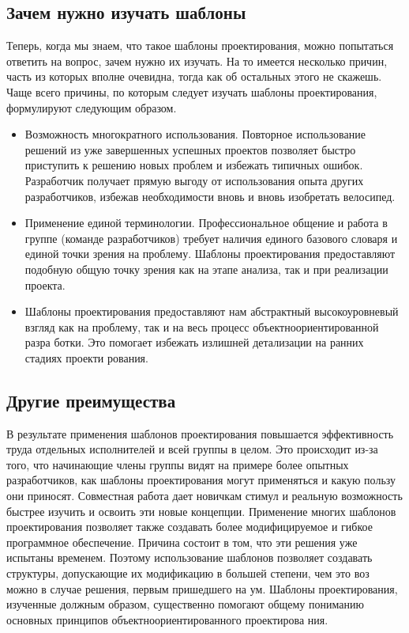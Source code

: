 \documentclass[10pt]{article}
\begin{document}
\subsection{Зачем нужно изучать шаблоны}
Теперь, когда мы знаем, что такое шаблоны проектирования, можно попытаться
ответить на вопрос, зачем нужно их изучать. На то имеется несколько причин, часть
из которых вполне очевидна, тогда как об остальных этого не скажешь.
Чаще всего причины, по которым следует изучать шаблоны проектирования,
формулируют следующим образом.
\begin{itemize}
	\item Возможность многократного использования. Повторное использование решений из
уже завершенных успешных проектов позволяет быстро приступить к решению
новых проблем и избежать типичных ошибок. Разработчик получает прямую
выгоду от использования опыта других разработчиков, избежав необходимости
вновь и вновь изобретать велосипед.
\item
Применение единой терминологии. Профессиональное общение и работа в группе
(команде разработчиков) требует наличия единого базового словаря и единой
точки зрения на проблему. Шаблоны проектирования предоставляют подобную
общую точку зрения как на этапе анализа, так и при реализации проекта.
\item 
Шаблоны проектирования предоставляют нам абстрактный высокоуровневый
взгляд как на проблему, так и на весь процесс объектноориентированной разра
ботки. Это помогает избежать излишней детализации на ранних стадиях проекти
рования.
\end{itemize}

\subsection{Другие преимущества}
В результате применения шаблонов проектирования повышается эффективность труда отдельных
исполнителей и всей группы в целом. Это происходит из-за того, что начинающие члены группы
видят на примере более опытных разработчиков, как шаблоны проектирования могут
применяться и какую пользу они приносят. Совместная работа дает новичкам стимул
и реальную возможность быстрее изучить и освоить эти новые концепции.
Применение многих шаблонов проектирования позволяет также создавать более
модифицируемое и гибкое программное обеспечение. Причина состоит в том, что
эти решения уже испытаны временем. Поэтому использование шаблонов позволяет
создавать структуры, допускающие их модификацию в большей степени, чем это воз
можно в случае решения, первым пришедшего на ум.
Шаблоны проектирования, изученные должным образом, существенно помогают
общему пониманию основных принципов объектноориентированного проектирова
ния.
\end{document}
